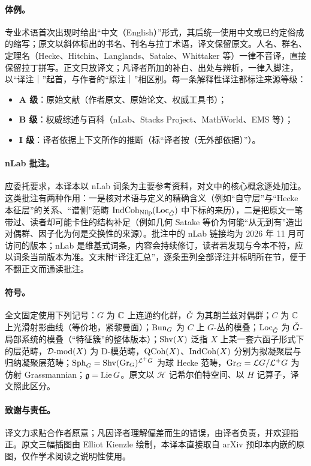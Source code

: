 \documentclass[11pt,a4paper,fontset=windows,UTF8]{ctexart}
\begin{document}
\paragraph{体例。}专业术语首次出现时给出“中文（English）”形式，其后统一使用中文或已约定俗成的缩写；原文以斜体标出的书名、刊名与拉丁术语，译文保留原文。人名、群名、定理名（Hecke、Hitchin、Langlands、Satake、Whittaker 等）一律不音译，直接保留拉丁拼写。正文只放译文；凡译者所加的补白、出处与辨析，一律入脚注，以“译注｜”起首，与作者的“原注｜”相区别。每一条解释性译注都标注来源等级：
\begin{itemize}
\item \textbf{A 级}：原始文献（作者原文、原始论文、权威工具书）；
\item \textbf{B 级}：权威综述与百科（nLab、Stacks Project、MathWorld、EMS 等）；
\item \textbf{I 级}：译者依据上下文所作的推断（标“译者按（无外部依据）”）。
\end{itemize}

\paragraph{nLab 批注。}应委托要求，本译本以 nLab 词条为主要参考资料，对文中的核心概念逐处加注。这类批注有两种作用：一是核对术语与定义的精确含义（例如“自守层”与“Hecke 本征层”的关系、“谱侧”范畴 $\operatorname{IndCoh}_{\operatorname{Nilp}}(\operatorname{Loc}_{\check{G}})$ 中下标的来历），二是把原文一笔带过、读者却可能卡住的结构补足（例如几何 Satake 等价为何能“从无到有”造出对偶群、因子化为何是交换性的来源）。批注中的 nLab 链接均为 2026 年 11 月可访问的版本；nLab 是维基式词条，内容会持续修订，读者若发现与今本不符，应以词条当前版本为准。文末附“译注汇总”，逐条重列全部译注并标明所在节，便于不翻正文而通读批注。

\paragraph{符号。}全文固定使用下列记号：$G$ 为 $\mathbb{C}$ 上连通约化群，$\check{G}$ 为其朗兰兹对偶群；$C$ 为 $\mathbb{C}$ 上光滑射影曲线（等价地，紧黎曼面）；$\operatorname{Bun}_{G}$ 为 $C$ 上 $G$-丛的模叠；$\operatorname{Loc}_{\check{G}}$ 为 $\check{G}$-局部系统的模叠（“特征簇”的整体版本）；$\operatorname{Shv}(X)$ 泛指 $X$ 上某一套六函子形式下的层范畴，$\mathcal{D}\text{-}\mathrm{mod}(X)$ 为 D-模范畴，$\operatorname{QCoh}(X)$、$\operatorname{IndCoh}(X)$ 分别为拟凝聚层与归纳凝聚层范畴；$\operatorname{Sph}_{G}=\operatorname{Shv}(\operatorname{Gr}_{G})^{\mathcal{L}^{+}G}$ 为球 Hecke 范畴，$\operatorname{Gr}_{G}=\mathcal{L}G/\mathcal{L}^{+}G$ 为仿射 Grassmannian；$\mathfrak{g}=\operatorname{Lie}G$。原文以 $\mathcal{H}$ 记希尔伯特空间、以 $H$ 记算子，译文照此区分。

\paragraph{致谢与责任。}译文力求贴合作者原意；凡因译者理解偏差而生的错误，由译者负责，并欢迎指正。原文三幅插图由 Elliot Kienzle 绘制，本译本直接取自 arXiv 预印本内嵌的原图，仅作学术阅读之说明性使用。
\end{document}
